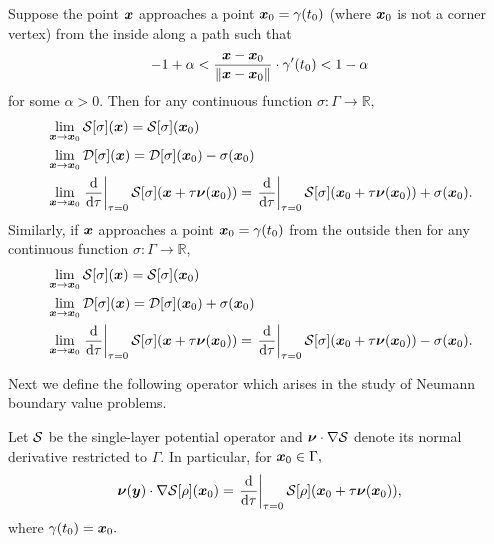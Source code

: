 \begin{theorem}\label{thm:potlim}
Suppose the point $\boldsymbol{x}$ approaches a point $\boldsymbol{x}_0 = \gamma(t_0)$ (where $\boldsymbol{x}_{0}$ is not a corner vertex) from the inside along a path such that 
\begin{align}
-1+\alpha<\frac{\boldsymbol{x}-\boldsymbol{x}_0}{\|\boldsymbol{x}-\boldsymbol{x}_0\|} \cdot \gamma'(t_0) <1-\alpha
\end{align}
for some $\alpha >0.$ Then for any continuous function $\sigma:\Gamma \to \mathbb{R},$
\begin{align}
&\lim_{\boldsymbol{x} \to \boldsymbol{x}_0} \mathcal{S}[\sigma](\boldsymbol{x}) = \mathcal{S}[\sigma](\boldsymbol{x}_0)\\
&\lim_{\boldsymbol{x} \to \boldsymbol{x}_0} \mathcal{D}[\sigma](\boldsymbol{x}) = \mathcal{D}[\sigma](\boldsymbol{x}_0)- \sigma(\boldsymbol{x}_0)\\
&\lim_{\boldsymbol{x} \to \boldsymbol{x}_0} \left.\frac{{\rm d}}{{\rm d}\tau}\right|_{\tau= 0}\mathcal{S}[\sigma](\boldsymbol{x}+\tau \boldsymbol{\nu}(\boldsymbol{x}_0)) = \left.\frac{{\rm d}}{{\rm d}\tau}\right|_{\tau= 0}\mathcal{S}[\sigma](\boldsymbol{x}_0+\tau \boldsymbol{\nu}(\boldsymbol{x}_0))+ \sigma(\boldsymbol{x}_0).
\end{align}
Similarly, if $\boldsymbol{x}$ approaches a point $\boldsymbol{x}_0 = \gamma(t_0)$ from the outside then for any continuous function $\sigma:\Gamma \to \mathbb{R},$
\begin{align}
&\lim_{\boldsymbol{x} \to \boldsymbol{x}_0} \mathcal{S}[\sigma](\boldsymbol{x}) = \mathcal{S}[\sigma](\boldsymbol{x}_0)\\
&\lim_{\boldsymbol{x} \to \boldsymbol{x}_0} \mathcal{D}[\sigma](\boldsymbol{x}) = \mathcal{D}[\sigma](\boldsymbol{x}_0)+ \sigma(\boldsymbol{x}_0)\\
&\lim_{\boldsymbol{x} \to \boldsymbol{x}_0} \left.\frac{{\rm d}}{{\rm d}\tau}\right|_{\tau= 0}\mathcal{S}[\sigma](\boldsymbol{x}+\tau \boldsymbol{\nu}(\boldsymbol{x}_0)) = \left.\frac{{\rm d}}{{\rm d}\tau}\right|_{\tau= 0}\mathcal{S}[\sigma](\boldsymbol{x}_0+\tau \boldsymbol{\nu}(\boldsymbol{x}_0))- \sigma(\boldsymbol{x}_0).
\end{align}
\end{theorem}

Next we define the following operator which arises in the study of Neumann boundary value problems.
\begin{definition}\label{def_singder}
Let $\mathcal{S}$ be the single-layer potential operator and $\boldsymbol{\nu}\cdot \nabla \mathcal{S}$  denote its normal derivative restricted to $\Gamma.$ In particular, for $\boldsymbol{x}_0 \in \Gamma,$
\begin{align}
\boldsymbol{\nu}(\boldsymbol{y})\cdot \nabla \mathcal{S}[\rho] (\boldsymbol{x}_0) = \left.\frac{{\rm d}}{{\rm d}\tau}\right|_{\tau = 0} \mathcal{S}[\rho](\boldsymbol{x}_0 + \tau \boldsymbol{\nu}(\boldsymbol{x}_0)),
\end{align}
where $\gamma(t_0) = \boldsymbol{x}_0.$
\end{definition}

